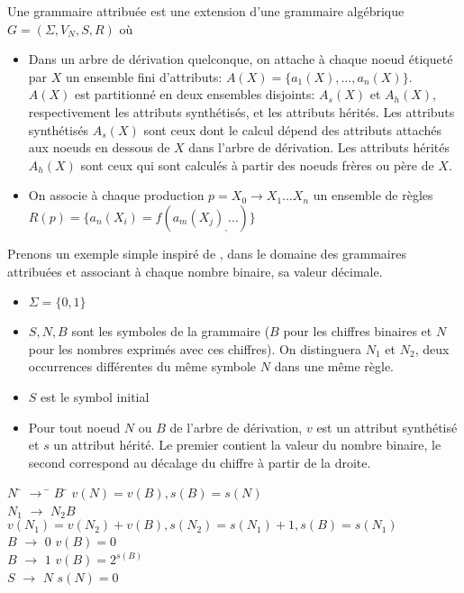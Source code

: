\documentclass[11pt]{article}
\newcommand{\Num}{4}
\newcounter{numexercice}
\newenvironment{exercice}{\addtocounter{numexercice}{1}
\noindent{\large \bf Exercice {\Num}.\thenumexercice }}{\bigskip}
\begin{document}
\begin{exercice}
\par

Une grammaire attribuée est une extension d'une grammaire algébrique $G=(\Sigma, V_N, S, R)$ où 

\begin{itemize}
\item Dans un arbre de dérivation quelconque, on attache à chaque
  noeud étiqueté par $X$ un ensemble fini d’attributs: $A(X) = \{a_1(X), \dots, a_n(X)\}$.\\
  $A(X)$ est partitionné en deux ensembles disjoints: $A_s(X)$ et
  $A_h(X)$, respectivement les attributs synthétisés, et les attributs
  hérités. Les attributs synthétisés $A_s(X)$ sont ceux dont le calcul
  dépend des attributs attachés aux noeuds en dessous de $X$ dans
  l'arbre de dérivation. Les attributs hérités $A_h(X)$ sont ceux qui
  sont calculés à partir des noeuds frères ou père de $X$.

\item On associe à chaque production $p=X_0 \rightarrow X_1 \dots X_n$
  un ensemble de règles
  $R(p) = \{a_n(X_i) = f(a_m(X_j)_,\dots)\}$

\end{itemize}

Prenons un exemple simple inspiré de \cite{DBLP:journals/mst/Knuth68},
dans le domaine des grammaires attribuées et associant à chaque nombre
binaire, sa valeur décimale.

\begin{itemize}
\item $\Sigma = \{0, 1\}$

\item $S, N, B$ sont les symboles de la grammaire ($B$ pour les
  chiffres binaires et $N$ pour les nombres exprimés avec ces
  chiffres). On distinguera $N_1$ et $N_2$, deux occurrences
  différentes du même symbole $N$ dans une même règle.

\item $S$ est le symbol initial

\item Pour tout noeud $N$ ou $B$ de l'arbre de dérivation, $v$ est un
  attribut synthétisé et $s$ un attribut hérité. Le premier contient
  la valeur du nombre binaire, le second correspond au décalage du
  chiffre à partir de la droite.

\end{itemize}

\begin{tabbing}
$N$ \= $\rightarrow$ \= $B$ \hspace{1in} \= $v(N) = v(B), s(B) = s(N)$\\
$N_1$ \> $\rightarrow$ \> $N_2 B$ \> $v(N_1) = v(N_2)+v(B), s(N_2) = s(N_1)+1, s(B)=s(N_1)$\\
$B$ \> $\rightarrow$ \> $0$ \> $v(B) = 0$\\
$B$ \> $\rightarrow$ \> $1$ \> $v(B)=2^{s(B)}$\\
$S$ \> $\rightarrow$ \> $N$ \> $s(N)=0$\\
\end{tabbing}


\end{exercice}
\end{document}
